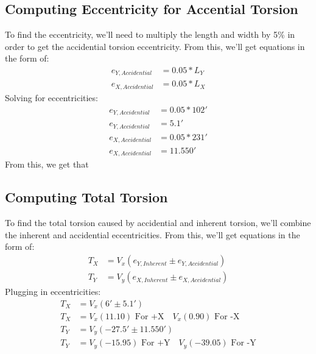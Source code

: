 \documentclass{report} %
\begin{document}
\subsection*{Computing Eccentricity for Accential Torsion}
To find the eccentricity, we'll need to multiply the length and width by 5\% in order to get the accidential torsion eccentricity. From this, we'll get equations in the form of:
\begin{equation*}
    \begin{aligned}
        e_{Y,Accidential} &= 0.05 * L_Y \\
        e_{X,Accidential} &= 0.05 * L_X 
    \end{aligned}
\end{equation*}
Solving for eccentricities:
\begin{equation*}
    \begin{aligned}
        e_{Y,Accidential} &= 0.05 * 102' \\
        e_{Y,Accidential} &= 5.1' \\
        e_{X,Accidential} &= 0.05 * 231' \\
        e_{X,Accidential} &= 11.550'
    \end{aligned}
\end{equation*}
From this, we get that  \\

\subsection*{Computing Total Torsion}
To find the total torsion caused by accidential and inherent torsion, we'll combine the inherent and accidential eccentricities. From this, we'll get equations in the form of:
\begin{equation*}
    \begin{aligned}
        T_X &= V_x (e_{Y,Inherent} \pm e_{Y,Accidential}) \\
        T_Y &= V_y (e_{X,Inherent} \pm e_{X,Accidential}) 
    \end{aligned}
\end{equation*}
Plugging in eccentricities:
\begin{equation*}
    \begin{aligned}
        T_X &= V_x (6' \pm 5.1') \\
        T_X &= V_x (11.10) \text{ For +X} \quad V_x (0.90) \text{ For -X} \\
        T_Y &= V_y (-27.5' \pm 11.550') \\
        T_Y &= V_y (-15.95) \text{ For +Y} \quad V_y (-39.05) \text{ For -Y}
    \end{aligned}
\end{equation*}
 
\end{document}
